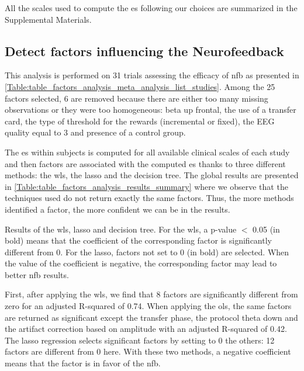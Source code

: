 All the scales used to compute the \gls{es} following our choices are summarized in the Supplemental Materials.

\subsection{Detect factors influencing the Neurofeedback}

This analysis is performed on 31 trials assessing the efficacy of \gls{nfb} as presented in \cref{Table:table_factors_analysis_meta_analysis_list_studies}. 
Among the 25 factors selected, 6 are removed because there are either too many missing observations or they were too homogeneous: beta up frontal, 
the use of a transfer card, the type of threshold for the rewards (incremental or fixed), the EEG quality equal to 3 and presence of a control group. 

The \gls{es} within subjects is computed for all available clinical scales of each study and then factors are associated with the computed \gls{es}
thanks to three different methods: the \gls{wls}, the \gls{lasso} and the decision tree. The global results are presented in \cref{Table:table_factors_analysis_results_summary}
where we observe that the techniques used do not return exactly the same factors. Thus, the more methods identified a factor, the more confident we can be in
the results.  

\begin{table}[h!]
  \centering
  \caption{Results of the \gls{wls}, \gls{lasso} and decision tree. For the \gls{wls}, a p-value $<$ 0.05 (in bold) means that the coefficient of 
	the corresponding factor is significantly different from 0. For the \gls{lasso}, factors not set to 0 (in bold) are selected. 
	When the value of the coefficient is negative, the corresponding factor may lead to better \gls{nfb} results.}
  
  \label{Table:table_factors_analysis_results_summary}
\end{table}

First, after applying the \gls{wls}, we find that 8 factors are significantly different from zero for an adjusted R-squared of 0.74. 
When applying the \gls{ols}, the same factors are returned as significant except the transfer phase, the protocol theta down and the artifact correction
based on amplitude with an adjusted R-squared of 0.42. The \gls{lasso} regression selects significant factors by setting to 0 the others: 12 factors 
are different from 0 here. With these two methods, a negative coefficient means that the factor is in favor of the \gls{nfb}.

